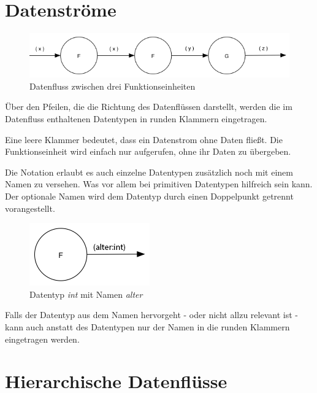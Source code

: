 \section{Datenströme}


\begin{figure}[!htbp]
	\includegraphics[width=1\linewidth]{./img/diagram1.png}
	\caption{Datenfluss zwischen drei Funktionseinheiten}
\end{figure}






Über den Pfeilen, die die Richtung des Datenflüssen darstellt, werden die im
Datenfluss enthaltenen Datentypen in runden Klammern eingetragen.

Eine leere Klammer bedeutet, dass ein Datenstrom ohne Daten fließt.
Die Funktionseinheit wird einfach nur aufgerufen, ohne ihr Daten zu übergeben.


Die Notation erlaubt es auch einzelne Datentypen zusätzlich noch mit einem Namen
zu versehen. Was vor allem bei primitiven Datentypen hilfreich sein kann. 
Der optionale Namen wird dem Datentyp durch einen Doppelpunkt getrennt vorangestellt.

\begin{figure}[!htbp]
	\centering
	\includegraphics[width=.4\linewidth]{./img/diagramNamedType.png}
	\caption{Datentyp \textit{int} mit Namen \textit{alter}}
\end{figure}


Falls der Datentyp aus dem Namen hervorgeht - oder nicht allzu relevant ist - kann auch anstatt des Datentypen nur der Namen in die runden Klammern eingetragen werden.


\clearpage

\section{Hierarchische Datenflüsse}




